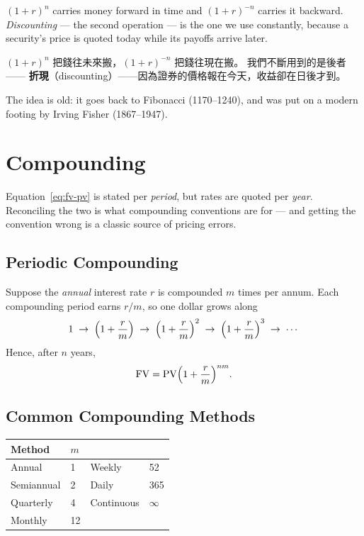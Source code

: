 \suppstart
\begin{intuition}
	$(1+r)^{n}$ carries money forward in time and $(1+r)^{-n}$ carries it backward.
	\emph{Discounting} --- the second operation --- is the one we use constantly, because a security's price is quoted today while its payoffs arrive later.

	$(1+r)^{n}$ 把錢往未來搬，$(1+r)^{-n}$ 把錢往現在搬。
	我們不斷用到的是後者—— \textbf{折現}（discounting）——因為證券的價格報在今天，收益卻在日後才到。
\end{intuition}
\suppend

The idea is old: it goes back to Fibonacci (1170--1240), and was put on a modern footing by Irving Fisher (1867--1947).

\section{Compounding}


Equation~\eqref{eq:fv-pv} is stated per \emph{period}, but rates are quoted per \emph{year}.
Reconciling the two is what compounding conventions are for --- and getting the convention wrong is a classic source of pricing errors.

\subsection{Periodic Compounding}

Suppose the \emph{annual} interest rate $r$ is compounded $m$ times per annum.
Each compounding period earns $r/m$, so one dollar grows along
\[
	1 \;\to\; \Bigl(1+\frac{r}{m}\Bigr)
	\;\to\; \Bigl(1+\frac{r}{m}\Bigr)^{2}
	\;\to\; \Bigl(1+\frac{r}{m}\Bigr)^{3}
	\;\to\; \cdots
\]
Hence, after $n$ years,
\begin{equation}
	\mathrm{FV} = \mathrm{PV}\Bigl(1+\frac{r}{m}\Bigr)^{nm}. \label{eq:periodic}
\end{equation}

\subsection{Common Compounding Methods}

\begin{center}
	\begin{tabular}{@{}ll@{\qquad}ll@{}}
		\toprule
		Method      & $m$ &                  &      \\
		\midrule
		Annual      & 1   & Weekly                 & 52       \\
		Semiannual  & 2   & Daily                  & 365      \\
		Quarterly   & 4   & Continuous             & $\infty$ \\
		Monthly     & 12  &                        &          \\
		\bottomrule
	\end{tabular}
\end{center}

